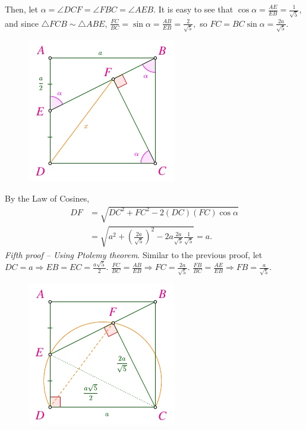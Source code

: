 \begin{multicols}{2}
	Then, let $\alpha = \angle DCF = \angle FBC = \angle AEB.$
	It is easy to see that $\cos{\alpha} = \frac{AE}{EB} = \frac{1}{\sqrt{5}},$
	and since $\triangle FCB \sim \triangle ABE$, $\frac{FC}{BC} = \sin{\alpha} = \frac{AB}{EB} = \frac{2}{\sqrt{5}},$
	so $FC = BC \sin{\alpha} = \frac{2a}{\sqrt{5}}.$
	\begin{figure}[H]
		\vspace*{-10pt}
		\centering
		\captionsetup{labelformat= empty, justification=centering}
		\includegraphics[width= 0.65\linewidth]{2022-2-ms-1-1-h.pdf}
		\vspace*{-15pt}
	\end{figure}	
	By the Law of Cosines,
	\begin{align*}
		DF &= \sqrt{DC^2 +  FC^2 - 2(DC)(FC)\cos{\alpha}}\\
		&= \sqrt{a^2 + \left(\frac{2a}{\sqrt{5}}\right)^2 - 2a \frac{2a}{\sqrt{5}} \frac{1}{\sqrt{5}}} = a.
	\end{align*}
	\textit{Fifth proof -- Using Ptolemy theorem}.
	Similar to the previous proof,
	let $DC = a \Rightarrow EB = EC = \frac{a\sqrt{5}}{2}.$ 
	$\frac{FC}{BC} = \frac{AB}{EB} \Rightarrow FC=\frac{2a}{\sqrt{5}}.$
	$\frac{FB}{BC} = \frac{AE}{EB} \Rightarrow FB=\frac{a}{\sqrt{5}}.$
	\begin{figure}[H]
		\vspace*{-15pt}
		\centering
		\captionsetup{labelformat= empty, justification=centering}
		\includegraphics[width= 0.65\linewidth]{2022-2-ms-1-1-i.pdf}

\end{figure}
\end{multicols}
